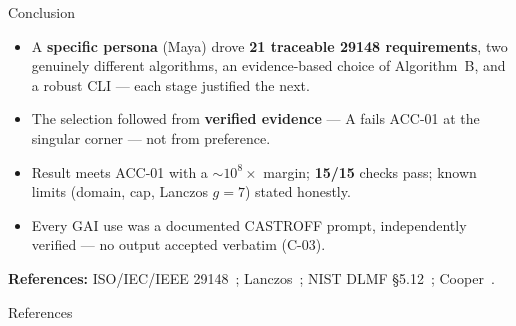 \documentclass[aspectratio=169]{beamer}
\begin{document}
\begin{frame}{Conclusion}
  \begin{itemize}
    \item A \textbf{specific persona} (Maya) drove \textbf{21 traceable 29148
          requirements}, two genuinely different algorithms, an evidence-based choice of
          Algorithm~B, and a robust CLI --- each stage justified the next.
    \item The selection followed from \textbf{verified evidence} --- A fails ACC-01 at the
          singular corner --- not from preference.
    \item Result meets ACC-01 with a $\sim10^{8}\times$ margin; \textbf{15/15} checks pass;
          known limits (domain, cap, Lanczos $g{=}7$) stated honestly.
    \item Every GAI use was a documented CASTROFF prompt, independently verified ---
          no output accepted verbatim (C-03).
  \end{itemize}
  \vfill
  \centering\small
  \textbf{References:} ISO/IEC/IEEE 29148~\cite{iso29148};
  Lanczos~\cite{lanczos1964gamma}; NIST DLMF \S5.12~\cite{dlmf512};
  Cooper~\cite{cooper2004inmates}.
\end{frame}

\begin{frame}[allowframebreaks]{References}
  \footnotesize
  
  
\end{frame}
\end{document}
